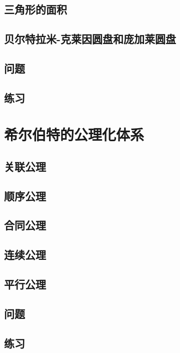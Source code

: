 \documentclass[cn,fancy,blue,11pt]{elegantbook}
\begin{document}
\section{三角形的面积}

\section{贝尔特拉米-克莱因圆盘和庞加莱圆盘}

\section{问题}

\section{练习}

\chapter{希尔伯特的公理化体系}

\section{关联公理}

\section{顺序公理}

\section{合同公理}

\section{连续公理}

\section{平行公理}

\section{问题}

\section{练习}
\end{document}
